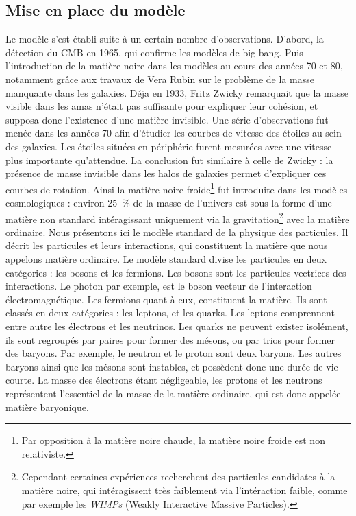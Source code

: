 \subsection{Mise en place du modèle}
Le modèle s'est établi suite à un certain nombre d'observations. D'abord, la détection du CMB en 1965, qui confirme les modèles de big bang.
Puis l'introduction de la matière noire dans les modèles au cours des années 70 et 80, notamment grâce aux travaux de Vera Rubin sur le problème de la masse manquante dans les galaxies. Déja en 1933, Fritz Zwicky remarquait que la masse visible dans les amas n'était pas suffisante pour expliquer leur cohésion, et supposa donc l'existence d'une matière invisible. Une série d'observations fut menée dans les années 70 afin d'étudier les courbes de vitesse des étoiles au sein des galaxies. Les étoiles situées en périphérie furent mesurées avec une vitesse plus importante qu'attendue. La conclusion fut similaire à celle de Zwicky : la présence de masse invisible dans les halos de galaxies permet d'expliquer ces courbes de rotation. Ainsi la matière noire froide\footnote{Par opposition à la matière noire chaude, la matière noire froide est non relativiste.} fut introduite dans les modèles cosmologiques :
environ \SI{25}{\percent} de la masse de l'univers est sous la forme d'une matière non standard intéragissant uniquement via la gravitation\footnote{Cependant certaines expériences recherchent des particules candidates à la matière noire, qui intéragissent très faiblement via l'intéraction faible, comme par exemple les \emph{WIMPs} (Weakly Interactive Massive Particles).} avec la matière ordinaire.
Nous présentons ici le modèle standard de la physique des particules. Il décrit les particules et leurs interactions, qui constituent la matière que nous appelons matière ordinaire.
Le modèle standard divise les particules en deux catégories : les bosons et les fermions. Les bosons sont les particules vectrices des interactions. Le photon par exemple, est le boson vecteur de l'interaction électromagnétique. Les fermions quant à eux, constituent la matière. Ils sont classés en deux catégories : les leptons, et les quarks. Les leptons comprennent entre autre les électrons et les neutrinos. Les quarks ne peuvent exister isolément, ils sont regroupés par paires pour former des mésons, ou par trios pour former des baryons. Par exemple, le neutron et le proton sont deux baryons. Les autres baryons ainsi que les mésons sont instables, et possèdent donc une durée de vie courte.
La masse des électrons étant négligeable, les protons et les neutrons représentent l’essentiel de la masse de la matière ordinaire, qui est donc appelée matière baryonique.

